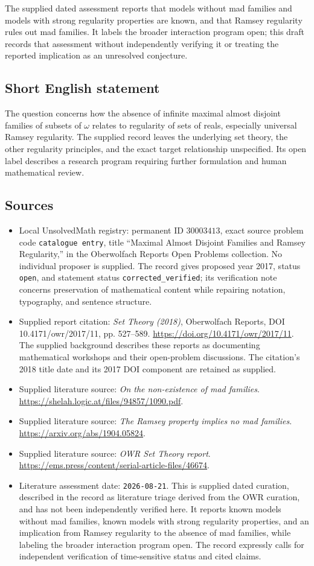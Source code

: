 \documentclass[11pt]{article}
\begin{document}
The supplied dated assessment reports that models without mad families and models with strong regularity properties are known, and that Ramsey regularity rules out mad families. It labels the broader interaction program open; this draft records that assessment without independently verifying it or treating the reported implication as an unresolved conjecture.
\subsection{Short English statement}
The question concerns how the absence of infinite maximal almost disjoint families of subsets of \(\omega\) relates to regularity of sets of reals, especially universal Ramsey regularity. The supplied record leaves the underlying set theory, the other regularity principles, and the exact target relationship unspecified. Its open label describes a research program requiring further formulation and human mathematical review.
\subsection{Sources}
\begin{itemize}
\item Local UnsolvedMath registry: permanent ID \(30003413\), exact source problem code \texttt{catalogue entry}, title ``Maximal Almost Disjoint Families and Ramsey Regularity,'' in the Oberwolfach Reports Open Problems collection. No individual proposer is supplied. The record gives proposed year 2017, status \texttt{open}, and statement status \texttt{corrected\_verified}; its verification note concerns preservation of mathematical content while repairing notation, typography, and sentence structure.
\item Supplied report citation: \emph{Set Theory (2018)}, Oberwolfach Reports, DOI 10.4171/owr/2017/11, pp. 527--589. \url{https://doi.org/10.4171/owr/2017/11}. The supplied background describes these reports as documenting mathematical workshops and their open-problem discussions. The citation's 2018 title date and its 2017 DOI component are retained as supplied.
\item Supplied literature source: \emph{On the non-existence of mad families}. \url{https://shelah.logic.at/files/94857/1090.pdf}.
\item Supplied literature source: \emph{The Ramsey property implies no mad families}. \url{https://arxiv.org/abs/1904.05824}.
\item Supplied literature source: \emph{OWR Set Theory report}. \url{https://ems.press/content/serial-article-files/46674}.
\item Literature assessment date: \texttt{2026-08-21}. This is supplied dated curation, described in the record as literature triage derived from the OWR curation, and has not been independently verified here. It reports known models without mad families, known models with strong regularity properties, and an implication from Ramsey regularity to the absence of mad families, while labeling the broader interaction program open. The record expressly calls for independent verification of time-sensitive status and cited claims.
\end{itemize}
\end{document}
